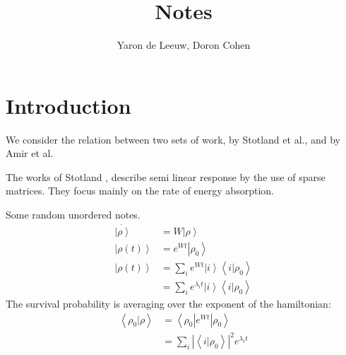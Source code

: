 \documentclass[onecolumn,fleqn]{revtex4}
\newcommand{\abs}[1]{\left|#1\right|}
\newcommand{\aket}[1]{\left| #1 \right\rangle}
\newcommand{\abra}[1]{\left\langle #1 \right|}
\newcommand{\abraket}[2]{\left\langle #1 | #2   \right\rangle}
\begin{document}
\title{Notes}

\author{Yaron de Leeuw, Doron Cohen}

\maketitle



\section{Introduction}
We consider the relation between two sets of work, by Stotland et al., and by Amir et al.

The works of Stotland \cite{Stotland:2010:PRB} \cite{Stotland:2009:EPL}, describe semi linear response by the use of sparse matrices. They focus mainly on the rate of energy absorption.

Some random unordered notes.
\begin{align}
\dot{\aket{\rho}}&=W\aket{\rho} \\
\aket{\rho(t)} &= e^{Wt}\aket{\rho_0} \\
\aket{\rho(t)} &= \sum_i e^{Wt}\aket{i}\abraket{i}{\rho_0} \\
&= \sum_i e^{\lambda_i t}\aket{i}\abraket{i}{\rho_0}
\end{align}
The survival probability is averaging over the exponent of the hamiltonian:
\begin{align}
\abraket{\rho_0}{\rho} &= \abra{\rho_0}e^{Wt}\aket{\rho_0} \\
&= \sum_i \abs{\abraket{i}{\rho_0}}^2e^{\lambda_it}
\end{align}



\end{document}
